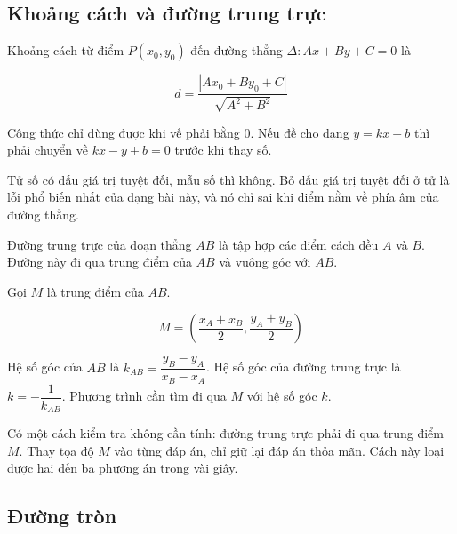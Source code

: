 \documentclass[11pt, a4paper]{article}
\begin{document}
\subsection{Khoảng cách và đường trung trực}

\begin{dinhnghia}
Khoảng cách từ điểm $P(x_0, y_0)$ đến đường thẳng $\Delta: Ax + By + C = 0$ là

$$d = \frac{|Ax_0 + By_0 + C|}{\sqrt{A^2 + B^2}}$$

 Công thức chỉ dùng được khi vế phải bằng $0$. Nếu đề cho dạng $y = kx + b$ thì phải chuyển về $kx - y + b = 0$ trước khi thay số.

 Tử số có dấu giá trị tuyệt đối, mẫu số thì không. Bỏ dấu giá trị tuyệt đối ở tử là lỗi phổ biến nhất của dạng bài này, và nó chỉ sai khi điểm nằm về phía âm của đường thẳng.
\end{dinhnghia}
\begin{dinhnghia}
Đường trung trực của đoạn thẳng $AB$ là tập hợp các điểm cách đều $A$ và $B$. Đường này đi qua trung điểm của $AB$ và vuông góc với $AB$.
\end{dinhnghia}
\begin{dinhly}
Gọi $M$ là trung điểm của $AB$.

$$M = \left(\frac{x_A + x_B}{2}, \frac{y_A + y_B}{2}\right)$$

Hệ số góc của $AB$ là $k_{AB} = \dfrac{y_B - y_A}{x_B - x_A}$. Hệ số góc của đường trung trực là $k = -\dfrac{1}{k_{AB}}$. Phương trình cần tìm đi qua $M$ với hệ số góc $k$.

 Có một cách kiểm tra không cần tính: đường trung trực phải đi qua trung điểm $M$. Thay tọa độ $M$ vào từng đáp án, chỉ giữ lại đáp án thỏa mãn. Cách này loại được hai đến ba phương án trong vài giây.
\end{dinhly}
\subsection{Đường tròn}
\end{document}
